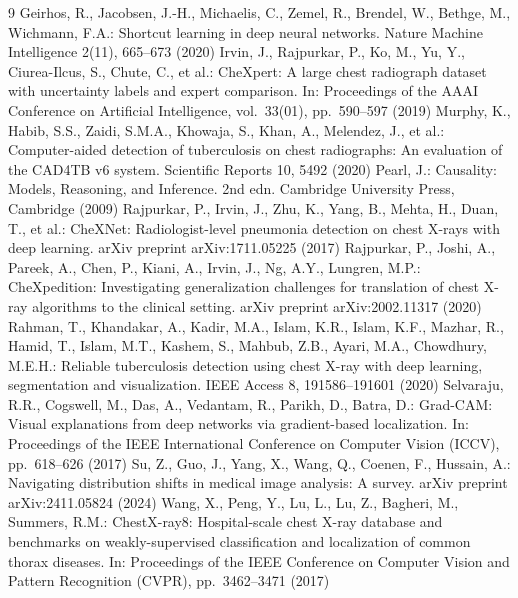 \documentclass[runningheads]{llncs}
\begin{document}
\begin{thebibliography}{9}
 Geirhos, R., Jacobsen, J.-H., Michaelis, C., Zemel, R., Brendel, W., Bethge, M., Wichmann, F.A.: Shortcut learning in deep neural networks. Nature Machine Intelligence 2(11), 665--673 (2020)
 Irvin, J., Rajpurkar, P., Ko, M., Yu, Y., Ciurea-Ilcus, S., Chute, C., et al.: CheXpert: A large chest radiograph dataset with uncertainty labels and expert comparison. In: Proceedings of the AAAI Conference on Artificial Intelligence, vol.~33(01), pp.~590--597 (2019)
 Murphy, K., Habib, S.S., Zaidi, S.M.A., Khowaja, S., Khan, A., Melendez, J., et al.: Computer-aided detection of tuberculosis on chest radiographs: An evaluation of the CAD4TB v6 system. Scientific Reports 10, 5492 (2020)
 Pearl, J.: Causality: Models, Reasoning, and Inference. 2nd edn. Cambridge University Press, Cambridge (2009)
 Rajpurkar, P., Irvin, J., Zhu, K., Yang, B., Mehta, H., Duan, T., et al.: CheXNet: Radiologist-level pneumonia detection on chest X-rays with deep learning. arXiv preprint arXiv:1711.05225 (2017)
 Rajpurkar, P., Joshi, A., Pareek, A., Chen, P., Kiani, A., Irvin, J., Ng, A.Y., Lungren, M.P.: CheXpedition: Investigating generalization challenges for translation of chest X-ray algorithms to the clinical setting. arXiv preprint arXiv:2002.11317 (2020)
 Rahman, T., Khandakar, A., Kadir, M.A., Islam, K.R., Islam, K.F., Mazhar, R., Hamid, T., Islam, M.T., Kashem, S., Mahbub, Z.B., Ayari, M.A., Chowdhury, M.E.H.: Reliable tuberculosis detection using chest X-ray with deep learning, segmentation and visualization. IEEE Access 8, 191586--191601 (2020)
 Selvaraju, R.R., Cogswell, M., Das, A., Vedantam, R., Parikh, D., Batra, D.: Grad-CAM: Visual explanations from deep networks via gradient-based localization. In: Proceedings of the IEEE International Conference on Computer Vision (ICCV), pp.~618--626 (2017)
 Su, Z., Guo, J., Yang, X., Wang, Q., Coenen, F., Hussain, A.: Navigating distribution shifts in medical image analysis: A survey. arXiv preprint arXiv:2411.05824 (2024)
 Wang, X., Peng, Y., Lu, L., Lu, Z., Bagheri, M., Summers, R.M.: ChestX-ray8: Hospital-scale chest X-ray database and benchmarks on weakly-supervised classification and localization of common thorax diseases. In: Proceedings of the IEEE Conference on Computer Vision and Pattern Recognition (CVPR), pp.~3462--3471 (2017)

\end{thebibliography}
\end{document}
